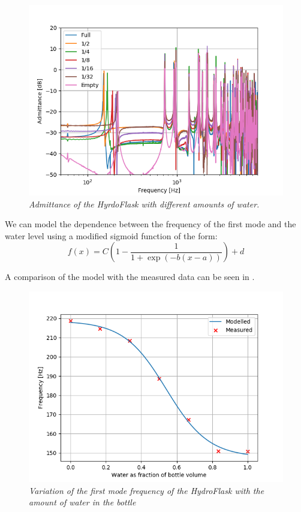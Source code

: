 \documentclass[twoside,a4paper]{article}
\begin{document}
%
\begin{figure}[!htb]
    \centering
    \includegraphics[width=\linewidth,trim={0 0 1cm 1cm},clip]{../Figures/DifferentLevels/HydroWaterLevelsAdmitt}
    \caption{\it{Admittance of the HyrdoFlask with different amounts of water.}}
    \label{fig:hydro-different-water-levels}
\end{figure}
%
We can model the dependence between the frequency of the
first mode and the water level using a modified sigmoid
function of the form:
\begin{equation}
    f(x) = C \left(1 - \frac{1}{1 + \exp(-b(x-a))} \right) + d
    \label{eq:mod_sigmoid}
\end{equation}

A comparison of the model with the measured data can be seen in .
%
\begin{figure}[!htb]
    \centering
    \includegraphics[width=\linewidth,trim={0 0 1cm 1cm},clip]{../Figures/Water_Freq}
    \caption{\it{Variation of the first mode frequency of the HydroFlask
                with the amount of water in the bottle}}
    \label{fig:water-mode-freq}
\end{figure}
%
\end{document}
